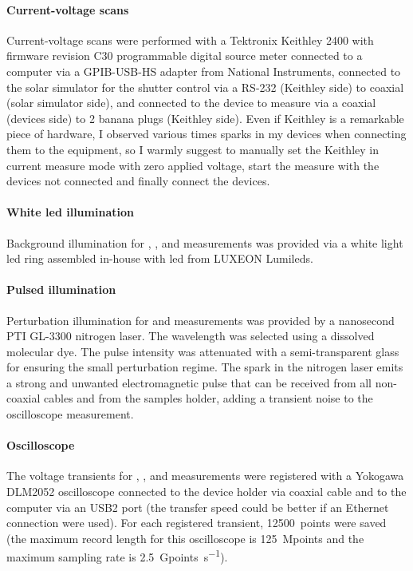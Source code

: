 	\paragraph{Current-voltage scans} Current-voltage scans were performed with a Tektronix Keithley 2400 with firmware revision C30 programmable digital source meter connected to a computer via a GPIB-USB-HS adapter from National Instruments, connected to the solar simulator for the shutter control via a RS-232 (Keithley side) to coaxial (solar simulator side), and connected to the device to measure via a coaxial (devices side) to 2 banana plugs (Keithley side). Even if Keithley is a remarkable piece of hardware, I observed various times sparks in my devices when connecting them to the equipment, so I warmly suggest to manually set the Keithley in current measure mode with zero applied voltage, start the measure with the devices not connected and finally connect the devices.

	\paragraph{White \gls{led} illumination} Background illumination for , , and  measurements was provided via a white light \gls{led} ring assembled in-house with \gls{led} from LUXEON Lumileds.

	\paragraph{Pulsed illumination} Perturbation illumination for  and  measurements was provided by a nanosecond PTI GL-3300 nitrogen laser. The wavelength was selected using a dissolved molecular dye. The pulse intensity was attenuated with a semi-transparent glass for ensuring the small perturbation regime. The spark in the nitrogen laser emits a strong and unwanted electromagnetic pulse that can be received from all non-coaxial cables and from the samples holder, adding a transient noise to the oscilloscope measurement.

	\paragraph{Oscilloscope} The voltage transients for , , and  measurements were registered with a Yokogawa DLM2052 oscilloscope connected to the device holder via coaxial cable and to the computer via an USB2 port (the transfer speed could be better if an Ethernet connection were used). For each registered transient, \SI{12500}{points} were saved (the maximum record length for this oscilloscope is \SI{125}{Mpoints} and the maximum sampling rate is \SI{2.5}{Gpoints\per\s}).

